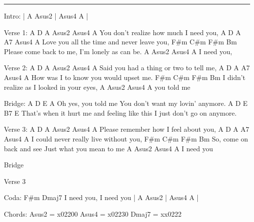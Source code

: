 \noindent\rule{\columnwidth}{1pt}

\begin{lstsong}
Intro: | A Asus2 | Asus4  A |

Verse 1:
A              D                 A   Asus2  Asus4 A
You don't realize how much I need you, 
A                D               A     A7  Asus4 A
Love you all the time and never leave you, 
       F#m         C#m      F#m           Bm
Please come back to me, I'm lonely as can be. 
  A   Asus2  Asus4  A
I need you,

Verse 2:
A              D                 A   Asus2  Asus4  A
Said you had a thing or two to tell me, 
A            D                A   A7  Asus4  A
How was I to know you would upset me. 
  F#m        C#m      F#m            Bm
I didn't realize as I looked in your eyes,  
    A    Asus2  Asus4  A
you told me 

Bridge:
A           D           E                      A
Oh yes, you told me You don't want my lovin' anymore. 
A              D           E                    B7                E       
That's when it hurt me and feeling like this I just don't go on anymore. 

Verse 3:
A               D           A    Asus2  Asus4  A
Please remember how I feel about you, 
A             D                A   A7  Asus4  A
I could never really live without you, 
    F#m              C#m       F#m              Bm
So, come on back and see  Just what you mean to me 
  A    Asus2  Asus4  A
I need you

Bridge

Verse 3

Coda:
  F#m         Dmaj7
I need you, I need you
| A Asus2 | Asus4 A |

Chords:
Asus2  =  x02200       Asus4  =  x02230        Dmaj7  =  xx0222
\end{lstsong}
\newpage


\begin{comment}
Great tab, but not quite correct in the bridge, I think. Here's what I hear:

Bridge
A    Aaug    D           
Oh yes you told me 
    E                       A   
You don't want my lovin' anymore.   
     Aaug      D           E           
That's when it hurt me and feeling like this 
  B             Bm    E(7)
I just can't go on anymore. 
\end{comment}
